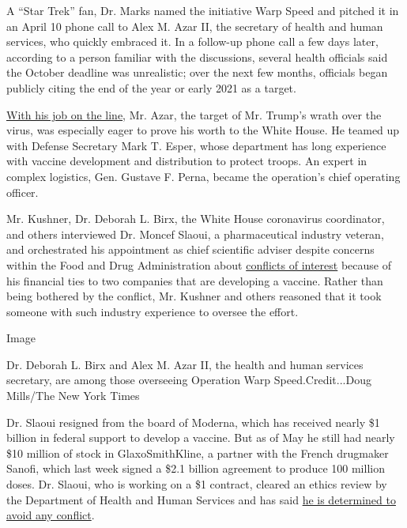 A ``Star Trek'' fan, Dr. Marks named the initiative Warp Speed and
pitched it in an April 10 phone call to Alex M. Azar II, the secretary
of health and human services, who quickly embraced it. In a follow-up
phone call a few days later, according to a person familiar with the
discussions, several health officials said the October deadline was
unrealistic; over the next few months, officials began publicly citing
the end of the year or early 2021 as a target.

\href{https://www.nytimes.com/2020/04/29/us/politics/coronavirus-trump-azar.html}{With
his job on the line}, Mr. Azar, the target of Mr. Trump's wrath over the
virus\href{https://www.nytimes.com/2020/04/29/us/politics/coronavirus-trump-azar.html}{,}
was especially eager to prove his worth to the White House. He teamed up
with Defense Secretary Mark T. Esper, whose department has long
experience with vaccine development and distribution to protect troops.
An expert in complex logistics, Gen. Gustave F. Perna, became the
operation's chief operating officer.

Mr. Kushner, Dr. Deborah L. Birx, the White House coronavirus
coordinator, and others interviewed Dr. Moncef Slaoui, a pharmaceutical
industry veteran, and orchestrated his appointment as chief scientific
adviser despite concerns within the Food and Drug Administration about
\href{https://www.nytimes.com/2020/07/15/us/politics/vaccine-Slaoui-coronavirus-trump.html}{conflicts
of interest} because of his financial ties to two companies that are
developing a vaccine. Rather than being bothered by the conflict, Mr.
Kushner and others reasoned that it took someone with such industry
experience to oversee the effort.

Image

Dr. Deborah L. Birx and Alex M. Azar II, the health and human services
secretary, are among those overseeing Operation Warp Speed.Credit...Doug
Mills/The New York Times

Dr. Slaoui resigned from the board of Moderna, which has received nearly
\$1 billion in federal support to develop a vaccine. But as of May he
still had nearly \$10 million of stock in GlaxoSmithKline, a partner
with the French drugmaker Sanofi, which last week signed a \$2.1 billion
agreement to produce 100 million doses. Dr. Slaoui, who is working on a
\$1 contract, cleared an ethics review by the Department of Health and
Human Services and has said
\href{https://www.nytimes.com/2020/05/20/health/coronavirus-vaccine-czar.html}{he
is determined to avoid any conflict}.

